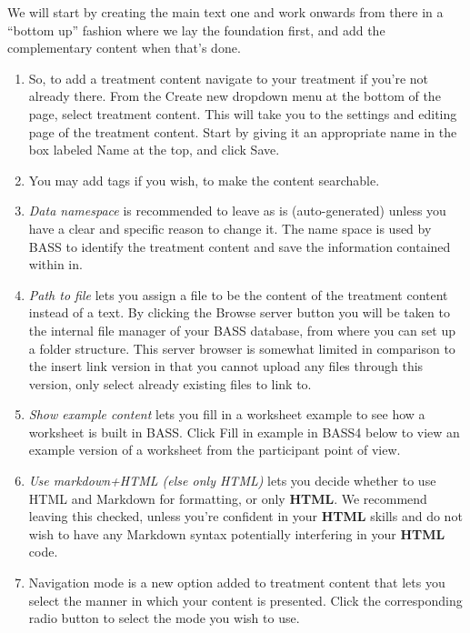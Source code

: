 \documentclass[]{book}
\providecommand{\tightlist}{%
  \setlength{\itemsep}{0pt}\setlength{\parskip}{0pt}}
\begin{document}
We will start by creating the main text one and work onwards from there in a ``bottom up'' fashion where we lay the foundation first, and add the complementary content when that's done.

\begin{enumerate}
\def\labelenumi{\arabic{enumi}.}
\tightlist
\item
  So, to add a treatment content navigate to your treatment if you're not already there. From the Create new dropdown menu at the bottom of the page, select treatment content. This will take you to the settings and editing page of the treatment content. Start by giving it an appropriate name in the box labeled Name at the top, and click Save.
\item
  You may add tags if you wish, to make the content searchable.
\item
  \emph{Data namespace} is recommended to leave as is (auto-generated) unless you have a clear and specific reason to change it. The name space is used by BASS to identify the treatment content and save the information contained within in.
\item
  \emph{Path to file} lets you assign a file to be the content of the treatment content instead of a text. By clicking the Browse server button you will be taken to the internal file manager of your BASS database, from where you can set up a folder structure. This server browser is somewhat limited in comparison to the insert link version in that you cannot upload any files through this version, only select already existing files to link to.
\item
  \emph{Show example content} lets you fill in a worksheet example to see how a worksheet is built in BASS. Click Fill in example in BASS4 below to view an example version of a worksheet from the participant point of view.
\item
  \emph{Use markdown+HTML (else only HTML)} lets you decide whether to use HTML and Markdown for formatting, or only \textbf{HTML}. We recommend leaving this checked, unless you're confident in your \textbf{HTML} skills and do not wish to have any Markdown syntax potentially interfering in your \textbf{HTML} code.
\item
  Navigation mode is a new option added to treatment content that lets you select the manner in which your content is presented. Click the corresponding radio button to select the mode you wish to use.


\end{enumerate}
\end{document}
